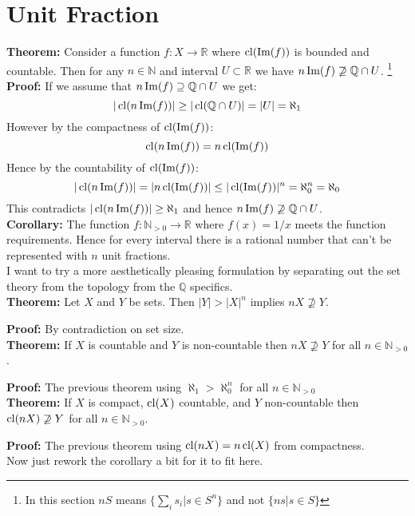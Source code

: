\section{Unit Fraction}
\textbf{Theorem:}
Consider a function $f:X \rightarrow \mathbb{R}$ where $\operatorname{cl}(\operatorname{Im}(f))$ is bounded and countable.
Then for any $n\in\mathbb{N}$ and interval $U\subset \mathbb{R}$ we have $n\operatorname{Im}(f) \not\supseteq\mathbb{Q} \cap U$.
\footnote{In this section $nS$ means $\{\sum_i s_i | s\in S^n\}$ and not $\{ns | s\in S\}$} 
\\

\textbf{Proof:}
If we assume that $n\operatorname{Im}(f) \supseteq \mathbb{Q} \cap U$ we get:
\[|\operatorname{cl}(n\operatorname{Im}(f))| \geq |\operatorname{cl}(\mathbb{Q} \cap U)| = |U| = \aleph_1 \]
However by the compactness of $\operatorname{cl}(\operatorname{Im}(f))$:
\[\operatorname{cl}(n\operatorname{Im}(f))= n\operatorname{cl}(\operatorname{Im}(f))\]
Hence by the countability of $\operatorname{cl}(\operatorname{Im}(f))$:
\[|\operatorname{cl}(n\operatorname{Im}(f))| = |n \operatorname{cl}(\operatorname{Im}(f))| \leq |\operatorname{cl}(\operatorname{Im}(f))|^n = \aleph_0^n = \aleph_0\]
This contradicts $|\operatorname{cl}(n\operatorname{Im}(f))| \geq \aleph_1$ and hence $n\operatorname{Im}(f) \not\supseteq\mathbb{Q} \cap U$.
\\

\textbf{Corollary:}
The function $f:\mathbb{N}_{>0} \rightarrow \mathbb{R}$ where $f(x) = 1/x$ meets the function requirements.
Hence for every interval there is a rational number that can't be represented with $n$ unit fractions.
\\

I want to try a more aesthetically pleasing formulation by separating out the set theory from the topology from the $\mathbb{Q}$ specifics. 
\\

\textbf{Theorem:} Let $X$ and $Y$ be sets. 
Then $|Y| > |X|^n$ implies $nX \not\supseteq Y$.

\textbf{Proof:} By contradiction on set size.
\\

\textbf{Theorem:} If $X$ is countable and $Y$ is non-countable then $nX \not\supseteq Y$ for all $n\in\mathbb{N}_{>0}$.

\textbf{Proof:} The previous theorem using $\aleph_1 > \aleph_0^n$ for all $n\in\mathbb{N}_{>0}$
\\

\textbf{Theorem:} If $X$ is compact, $\operatorname{cl}(X)$ countable, and $Y$ non-countable then $\operatorname{cl}(nX) \not\supseteq Y$ for all $n\in\mathbb{N}_{>0}$.

\textbf{Proof:} The previous theorem using $\operatorname{cl}(nX) = n\operatorname{cl}(X)$ from compactness.
\\

Now just rework the corollary a bit for it to fit here. 
